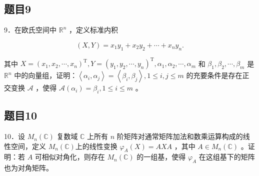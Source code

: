 \documentclass{article}
\begin{document}
\subsection{题目9}
9．在欧氏空间中 \(\mathbb{R}^{n}\) ，定义标准内积

\[
(X, Y)=x_{1} y_{1}+x_{2} y_{2}+\cdots+x_{n} y_{n} .
\]

其中 \(X=\left(x_{1}, x_{2}, \cdots, x_{n}\right)^{\mathrm{T}}, Y=\left(y_{1}, y_{2}, \cdots, y_{n}\right)^{\mathrm{T}}, \alpha_{1}, \alpha_{2}, \cdots, \alpha_{m}\) 和 \(\beta_{1}, \beta_{2}, \cdots, \beta_{m}\) 是 \(\mathbb{R}^{n}\) 中的向量组，证明：\(\left\langle\alpha_{i}, \alpha_{j}\right\rangle=\left\langle\beta_{i}, \beta_{j}\right\rangle, 1 \leq i, j \leq m\) 的充要条件是存在正交变换 \(\mathcal{A}\) ，使得 \(\mathcal{A}\left(\alpha_{i}\right)=\beta_{i}, 1 \leq i \leq m\) 。

\subsection{题目10}
10．设 \(M_{n}(\mathbb{C})\) 复数域 \(\mathbb{C}\) 上所有 \(n\) 阶矩阵对通常矩阵加法和数乘运算构成的线性空间，定义 \(M_{n}(\mathbb{C})\)上的线性变换 \(\varphi_{A}(X)=A X A\) ，其中 \(A \in M_{n}(\mathbb{C})\) 。证明：若 \(A\) 可相似对角化，则存在 \(M_{n}(\mathbb{C})\) 的一组基，使得 \(\varphi_{A}\) 在这组基下的矩阵也为对角矩阵。
\end{document}
